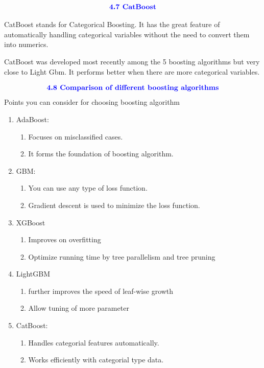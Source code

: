 \documentclass{homework}
\begin{document}
\begin{align*}
    \textcolor{blue}{ \text{{\textbf{4.7 CatBoost}}}}
 \end{align*}

 CatBoost stands for Categorical Boosting. It has the great feature of automatically handling categorical variables without the need to convert them into numerics.

CatBoost was developed most recently among the 5 boosting algorithms but very close to Light Gbm. It performs better when there are more categorical variables.

\begin{align*}
    \textcolor{blue}{ \text{{\textbf{4.8 Comparison of different boosting algorithms}}}}
 \end{align*}
 Points you can consider for choosing boosting algorithm
\begin{enumerate}
    \item AdaBoost:
        \begin{enumerate}
            \item Focuses on misclassified cases.
            \item It forms the foundation of boosting algorithm.
        \end{enumerate}
    \item GBM:
        \begin{enumerate}
            \item You can use any type of loss function.
            \item Gradient descent is used to minimize the loss function.
        \end{enumerate}
    \item XGBoost
        \begin{enumerate}
            \item Improves on overfitting 
            \item Optimize running time by tree parallelism and tree pruning
        \end{enumerate}
    \item LightGBM
        \begin{enumerate}
            \item further improves the speed of leaf-wise growth
            \item Allow tuning of more parameter
        \end{enumerate}
    \item CatBoost:
        \begin{enumerate}
            \item Handles categorial features automatically.
            \item Works efficiently with categorial type data.
        \end{enumerate}
\end{enumerate}
\end{document}
